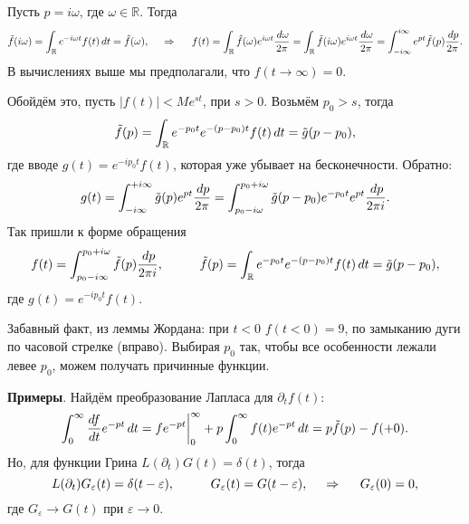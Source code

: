 Пусть $p = i \omega$, где $\omega \in \mathbb{R}$. Тогда
\begin{equation*}
    \tilde{f} (i \omega) = \int_{\mathbb{R}} e^{- i \omega t} f(t) \, d t = \hat{f} (\omega),
    \hspace{0.5cm} \Rightarrow \hspace{0.5cm}
    f(t)  =\int_{\mathbb{R}} \hat{f}(\omega) e^{i \omega t} \frac{\, d \omega}{2\pi} = 
    \int_{\mathbb{R}} \tilde{f} (i \omega) e^{i \omega t} \frac{\, d \omega}{2 \pi} = 
    \int_{- i \infty}^{i \infty} e^{p t} \tilde{f} (p) \frac{\, d p}{2\pi}.
\end{equation*}
В вычислениях выше мы предполагали, что $f(t \to \infty) = 0$. 

Обойдём это, пусть $|f(t)| < M e^{s t}$, при $s > 0$. Возьмём $p_0 > s$, тогда
\begin{equation*}
    \tilde{f} (p) = \int_{\mathbb{R}} e^{- p_0 t} e^{-(p-p_0)t} f(t) \, d t = \tilde{g}(p-p_0),
\end{equation*}
где вводе $g(t) = e^{- i p_0 t} f(t)$, которая уже убывает на бесконечности. Обратно:
\begin{equation*}
    g(t) = \int_{-i\infty}^{+i\infty}  \tilde{g}(p) e^{pt} \frac{\, d p}{2\pi} = 
    \int_{p_0 - i \omega}^{p_0 + i \omega} \tilde{g}(p-p_0) e^{- p_0 t} e^{pt} \frac{\, d p}{2\pi i}.
\end{equation*}
Так пришли к форме обращения
\begin{equation*}
    f(t) = \int_{p_0 - i \infty}^{p_0 + i \omega} \tilde{f}(p) \frac{\d p}{2 \pi i},
    \hspace{10 mm} 
    \tilde{f}(p) = \int_{\mathbb{R}} e^{- p_0  t} e^{-(p-p_0)t} f(t) \d t = \tilde{g}(p-p_0),
\end{equation*}
где $g(t) = e^{- i p_0 t} f(t)$.



Забавный факт, из леммы Жордана: при $t < 0$ $f(t<0) = 9$, по замыканию дуги по часовой стрелке (вправо). Выбирая $p_0$ так, чтобы все особенности лежали левее $p_0$, можем получать причинные функции. 




\textbf{Примеры}. Найдём преобразование Лапласа для $\partial_t f(t)$:
\begin{equation*}
    \int_{0}^{\infty} \frac{d f}{d t} e^{- p t} \, d t = f e^{- pt} \bigg|_0^{\infty} + p \int_{0}^{\infty} 
    f(t) e^{-pt} \, d t = p \tilde{f}(p) - f(+0).
\end{equation*}
Но, для функции Грина $L(\partial_t) G(t) = \delta(t)$, тогда
\begin{equation*}
    L(\partial_t) G_\varepsilon(t) = \delta(t-\varepsilon),
    \hspace{10 mm} 
    G_\varepsilon (t) = G(t-\varepsilon),
    \hspace{0.5cm} \Rightarrow \hspace{0.5cm}
    G_\varepsilon(0)=  0,
\end{equation*}
где $G_\varepsilon \to G(t)$ при $\varepsilon \to 0$. 

